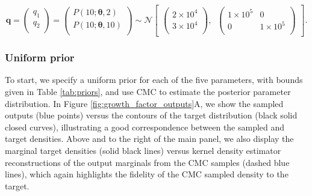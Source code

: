 \begin{equation}\label{eq:MM_outputDistribution}
\boldsymbol{q} =
\begin{pmatrix}
q_1\\
q_2\\
\end{pmatrix}
=
\begin{pmatrix}
P(10; \boldsymbol{\theta}, 2)\\
P(10; \boldsymbol{\theta}, 10)\\
\end{pmatrix} \sim  \mathcal{N}
\begin{bmatrix}
\begin{pmatrix}
2\times 10^4\\
3\times 10^4\\
\end{pmatrix}, \;\;
\begin{pmatrix}
1\times 10^5 & 0\\
0 & 1\times 10^5\\
\end{pmatrix}
\end{bmatrix}.
\end{equation}
%

\subsubsection{Uniform prior}
To start, we specify a uniform prior for each of the five parameters, with bounds given in Table \ref{tab:priors}, and use CMC to estimate the posterior parameter distribution. In Figure \ref{fig:growth_factor_outputs}A, we show the sampled outputs (blue points) versus the contours of the target distribution (black solid closed curves), illustrating a good correspondence between the sampled and target densities. Above and to the right of the main panel, we also display the marginal target densities (solid black lines) versus kernel density estimator reconstructions of the output marginals from the CMC samples (dashed blue lines), which again highlights the fidelity of the CMC sampled density to the target.

